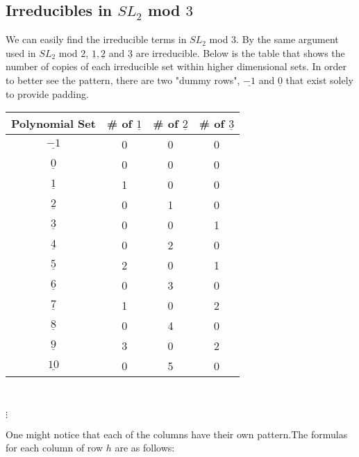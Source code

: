 \documentclass[a4paper,draft]{amsproc}
\theoremstyle{plain}
\theoremstyle{definition}
\theoremstyle{remark}
\numberwithin{equation}{section}
\begin{document}
\subsection{Irreducibles in $SL_{2}$ mod $3$}
We can easily find the irreducible terms in $SL_{2}$ mod $3$. By the same argument used in $SL_{2}$ mod $2$, $\underline{1}, \underline{2}$ and $\underline{3}$ are irreducible. Below is the table that shows the number of copies of each irreducible set within higher dimensional sets. In order to better see the pattern, there are two "dummy rows", $\underline{-1}$ and $\underline{0}$ that exist solely to provide padding. 
\begin{table}[h]
\begin{tabular}{|c|c|c|c|}
\hline
Polynomial Set & \# of $\underline{1}$ & \# of $\underline{2}$ & \# of $\underline{3}$ \\ \hline
$\underline{-1}$             & 0       & 0       & 0       \\ \hline
$\underline{0}$              & 0       & 0       & 0       \\ \hline
$\underline{1}$              & 1       & 0       & 0       \\ \hline
$\underline{2}$              & 0       & 1       & 0       \\ \hline
$\underline{3}$              & 0       & 0       & 1       \\ \hline
$\underline{4}$              & 0       & 2       & 0       \\ \hline
$\underline{5}$              & 2       & 0       & 1       \\ \hline
$\underline{6}$              & 0       & 3       & 0       \\ \hline
$\underline{7}$              & 1       & 0       & 2       \\ \hline
$\underline{8}$              & 0       & 4       & 0       \\ \hline
$\underline{9}$              & 3       & 0       & 2       \\ \hline
$\underline{10}$             & 0       & 5       & 0       \\ \hline
\end{tabular} \\
\begin{centering}$\vdots$\end{centering}
\end{table}

One might notice that each of the columns have their own pattern.The formulas for each column of row $h$ are as follows:  
\end{document}
